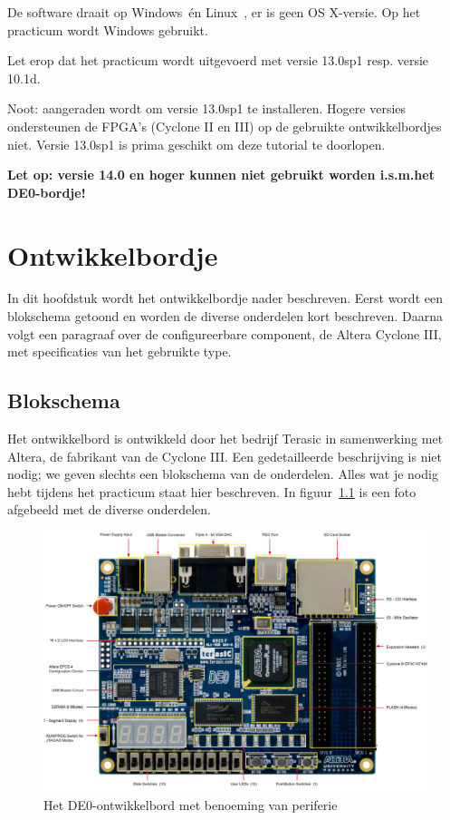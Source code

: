 \documentclass[a4paper,12pt,fleqn,twoside]{book}
\begin{document}
De software draait op Windows\texttrademark\ \'{e}n Linux\texttrademark\ , er
is geen OS X-versie. Op het practicum wordt Windows gebruikt.

Let erop dat het practicum wordt uitgevoerd met versie 13.0sp1 resp\@. versie
10.1d.

Noot: aangeraden wordt om versie 13.0sp1 te installeren. Hogere versies
ondersteunen de FPGA's (Cyclone II en III) op de gebruikte ontwikkelbordjes
niet. Versie 13.0sp1 is prima geschikt om deze tutorial te doorlopen.

\textbf{
Let op: versie 14.0 en hoger kunnen niet gebruikt worden i.s.m.\@ het
DE0-bordje!
}



\chapter{Ontwikkelbordje}
\label{chap:ontwikkelbordje}
In dit hoofdstuk wordt het ontwikkelbordje nader beschreven. Eerst wordt een
blokschema getoond en worden de diverse onderdelen kort beschreven. Daarna
volgt een paragraaf over de configureerbare component, de Altera Cyclone III,
met specificaties van het gebruikte type.


\section{Blokschema}
\label{sec:blokschema}
Het ontwikkelbord is ontwikkeld door het bedrijf Terasic in samenwerking met
Altera, de fabrikant van de Cyclone III. Een gedetailleerde beschrijving is
niet nodig; we geven slechts een blokschema van de onderdelen. Alles wat je
nodig hebt tijdens het practicum staat hier beschreven. In
figuur~\ref{fig:DE0-layout-yellow-1000} is een foto afgebeeld met de diverse
onderdelen.

\begin{figure}[H]
\centering
\includegraphics[scale=0.92]{DE0_layout_yellow_1000.jpg}
\caption{Het DE0-ontwikkelbord met benoeming van periferie}
\label{fig:DE0-layout-yellow-1000}
\end{figure}
\end{document}
